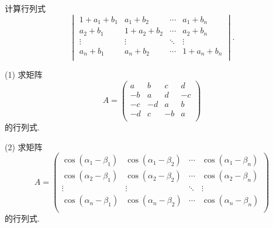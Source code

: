 \documentclass{ctexart}
\begin{document}
\begin{exercisec}[4.2.11(2)]
    计算行列式
    \[\begin{vmatrix}
        1+a_1+b_1 & a_1+b_2 & \cdots & a_1+b_n \\
        a_2+b_1 & 1+a_2+b_2 & \cdots & a_2+b_n \\
        \vdots & \vdots & \ddots & \vdots \\
        a_n+b_1 & a_n+b_2 & \cdots & 1+a_n+b_n \\
    \end{vmatrix}.\]
\end{exercisec}
\begin{exercisec}[4.2.12]
    (1) 求矩阵
    \[A=\begin{pmatrix}
        a & b & c & d \\
        -b & a & d & -c \\
        -c & -d & a & b \\
        -d & c & -b & a \\
    \end{pmatrix}\]
    的行列式.

    (2) 求矩阵
    \[A=\begin{pmatrix}
        \cos(\alpha_1-\beta_1) & \cos(\alpha_1-\beta_2) & \cdots & \cos(\alpha_1-\beta_n) \\
        \cos(\alpha_2-\beta_1) & \cos(\alpha_2-\beta_2) & \cdots & \cos(\alpha_2-\beta_n) \\
        \vdots & \vdots & \ddots & \vdots \\
        \cos(\alpha_n-\beta_1) & \cos(\alpha_n-\beta_2) & \cdots & \cos(\alpha_n-\beta_n) \\
    \end{pmatrix}\]
    的行列式.
\end{exercisec}
\end{document}
